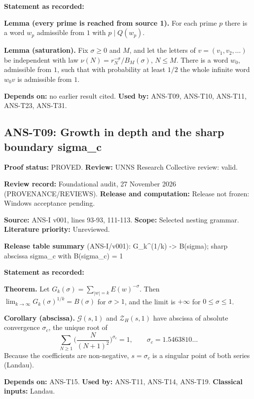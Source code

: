 \documentclass[
  11pt,
]{article}
\begin{document}
\textbf{Statement as recorded:}

\textbf{Lemma (every prime is reached from source 1).} For each prime
\(p\) there is a word \(w_p\) admissible from \(1\) with
\(p\mid Q(w_p)\).

\textbf{Lemma (saturation).} Fix \(\sigma\ge0\) and \(M\), and let the
letters of \(v=(v_1,v_2,\dots)\) be independent with law
\(\nu(N)=r_N^{-\sigma}/B_M(\sigma)\), \(N\le M\). There is a word
\(w_0\), admissible from \(1\), such that with probability at least
\(1/2\) the whole infinite word \(w_0v\) is admissible from \(1\).

\textbf{Depends on:} no earlier result cited. \textbf{Used by:} ANS-T09,
ANS-T10, ANS-T11, ANS-T23, ANS-T31.

\hypertarget{ans-t09-growth-in-depth-and-the-sharp-boundary-sigma_c}{%
\subsection{ANS-T09: Growth in depth and the sharp boundary
sigma\_c}\label{ans-t09-growth-in-depth-and-the-sharp-boundary-sigma_c}}

\textbf{Proof status:} PROVED. \textbf{Review:} UNNS Research Collective
review: valid.

\textbf{Review record:} Foundational audit, 27 November 2026
(PROVENANCE/REVIEWS). \textbf{Release and computation:} Release not
frozen: Windows acceptance pending.

\textbf{Source:} ANS-I v001, lines 93-93, 111-113. \textbf{Scope:}
Selected nesting grammar. \textbf{Literature priority:} Unreviewed.

\textbf{Release table summary} (ANS-I/v001): G\_k\^{}(1/k)
-\textgreater{} B(sigma); sharp abscissa sigma\_c with B(sigma\_c) = 1

\textbf{Statement as recorded:}

\textbf{Theorem.} Let \(G_k(\sigma)=\sum_{|w|=k}E(w)^{-\sigma}\). Then
\(\lim_{k\to\infty}G_k(\sigma)^{1/k}=B(\sigma)\) for \(\sigma>1\), and
the limit is \(+\infty\) for \(0\le\sigma\le1\).

\textbf{Corollary (abscissa).} \(\mathcal G(s,1)\) and
\(\mathcal Z_H(s,1)\) have abscissa of absolute convergence
\(\sigma_c\), the unique root of
\[\sum_{N\ge1}\Big(\frac{N}{(N+1)^2}\Big)^{\sigma_c}=1,\qquad\sigma_c=1.5463810\ldots\]
Because the coefficients are non-negative, \(s=\sigma_c\) is a singular
point of both series (Landau).

\textbf{Depends on:} ANS-T15. \textbf{Used by:} ANS-T11, ANS-T14,
ANS-T19. \textbf{Classical inputs:} Landau.
\end{document}
